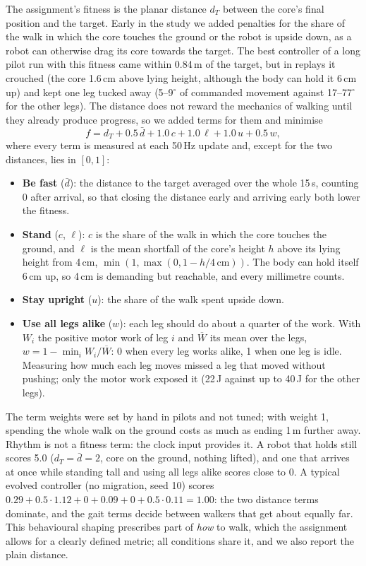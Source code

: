 \documentclass[sigconf]{acmart}
\begin{document}
The assignment's fitness is the planar distance $d_T$ between the core's final
position and the target. Early in the study we added penalties for the share
of the walk in which the core touches the ground or the robot is upside down,
as a robot can otherwise drag its core towards the target. The best controller of
a long pilot run with this fitness came within 0.84\,m of the target, but in
replays it crouched (the core 1.6\,cm above lying height, although the body can
hold it 6\,cm up) and kept one leg tucked away (5--9$^\circ$ of commanded
movement against 17--77$^\circ$ for the other legs). The distance does not
reward the mechanics of walking until they already produce progress, so we
added terms for them and minimise
\begin{equation}
  f = d_T + 0.5\,\bar{d} + 1.0\,c + 1.0\,\ell + 1.0\,u + 0.5\,w ,
  \label{eq:fitness}
\end{equation}
where every term is measured at each 50\,Hz update and, except for the two
distances, lies in $[0, 1]$:
\begin{itemize}
  \item \textbf{Be fast} ($\bar d$): the distance to the target averaged over
  the whole 15\,s, counting 0 after arrival, so that closing the distance early
  and arriving early both lower the fitness.
  \item \textbf{Stand} ($c$, $\ell$): $c$ is the share of the walk in which the
  core touches the ground, and $\ell$ is the mean shortfall of the core's
  height $h$ above its lying height from 4\,cm,
  $\min(1, \max(0, 1 - h / 4\,\mathrm{cm}))$. The body can hold itself 6\,cm
  up, so 4\,cm is demanding but reachable, and every millimetre counts.
  \item \textbf{Stay upright} ($u$): the share of the walk spent upside down.
  \item \textbf{Use all legs alike} ($w$): each leg should do about a quarter
  of the work. With $W_i$ the positive motor work of leg $i$ and
  $\overline{W}$ its mean over the legs, $w = 1 - \min_i W_i / \overline{W}$:
  0 when every leg works alike, 1 when one leg is idle. Measuring how much each
  leg moves missed a leg that moved without pushing; only the motor work
  exposed it (22\,J against up to 40\,J for the other legs).
\end{itemize}
The term weights were set by hand in pilots and not tuned; with weight 1, spending
the whole walk on the ground costs as much as ending 1\,m further away.
Rhythm is not a fitness term: the clock input provides it. A robot that holds
still scores 5.0 ($d_T = \bar d = 2$, core on the ground, nothing lifted), and
one that arrives at once while standing tall and using all legs alike scores
close to 0. A typical evolved controller
(no migration, seed 10) scores $0.29 + 0.5 \cdot 1.12 + 0 + 0.09 + 0 + 0.5
\cdot 0.11 = 1.00$: the two distance terms dominate, and the gait terms decide
between walkers that get about equally far. This behavioural shaping
prescribes part of \emph{how} to walk, which the assignment allows for a
clearly defined metric; all conditions share it, and we also report the plain
distance.
\end{document}
